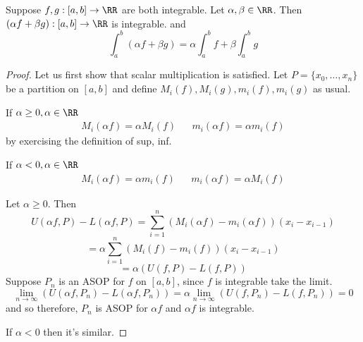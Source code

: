 \documentclass[12pt]{scrartcl}
\begin{document}
\begin{theorem}
  
Suppose $f, g: [a,b]\to\RR$ are both integrable. Let $\alpha, \beta \in \RR$. 
Then $(\alpha f + \beta g): [a,b] \to \RR$ is integrable. and 
\[\int_a^b (\alpha f + \beta g) = \alpha \int_a^b f + \beta\int_a^b g\]
\begin{proof}

\hfill
  
Let us first show that scalar multiplication is satisfied. Let $P = \{x_0, \ldots, x_n\}$ be a partition on $[a,b]$ and define 
$M_i(f), M_i(g), m_i(f), m_i(g)$ as usual. 

If $\alpha \geq 0, \alpha \in \RR$
\begin{align*}
  M_i(\alpha f) = \alpha M_i(f) && 
  m_i(\alpha f) = \alpha m_i(f)
\end{align*}
by exercising the definition of sup, inf.

If $\alpha < 0, \alpha \in \RR$
\begin{align*}
  M_i(\alpha f) = \alpha m_i(f) && 
  m_i(\alpha f) = \alpha M_i(f)
\end{align*}

Let $\alpha \geq 0$. Then 
\[U(\alpha f, P) - L(\alpha f, P) = \sum_{i=1}^n (M_i(\alpha f) - m_i(\alpha f))(x_i - x_{i-1})\]
\[= \alpha \sum_{i=1}^n (M_i(f) - m_i(f))(x_i - x_{i-1})\]
\[= \alpha (U(f, P) - L(f, P))\]
Suppose $P_n$ is an ASOP for $f$ on $[a,b]$, since $f$ is integrable take the limit.
\[\lim_{n\to\infty}(U(\alpha f, P_n) - L(\alpha f, P_n)) = \alpha \lim_{n\to\infty}(U(f, P_n) - L(f, P_n)) = 0\]
and so therefore, $P_n$ is ASOP for $\alpha f$ and $\alpha f$ is integrable.

If $\alpha < 0$ then it's similar.

\end{proof}

\end{theorem}
\end{document}
